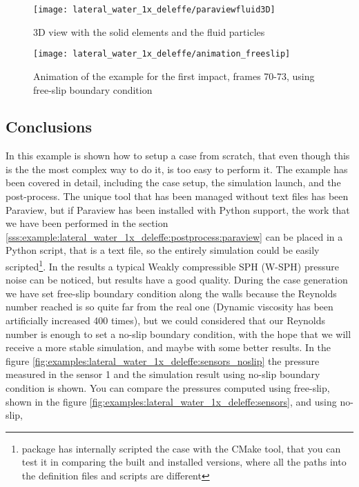 %
\begin{figure}[ht!]
  \centering
  \texttt{[image: lateral\_water\_1x\_deleffe/paraviewfluid3D]}
  \caption{3D view with the solid elements and the fluid particles}
  \label{fig:examples:lateral_water_1x_deleffe:paraviewfluid3D}
\end{figure}
%
\begin{figure}[ht!]
  \centering
  \texttt{[image: lateral\_water\_1x\_deleffe/animation\_freeslip]}
  \caption{Animation of the example for the first impact, frames 70-73, using free-slip boundary condition}
  \label{fig:examples:lateral_water_1x_deleffe:paraviewanimation}
\end{figure}
%
\subsection{Conclusions}
\label{ss:example:lateral_water_1x_deleffe:conclusions}
%
In this example is shown how to setup a case from scratch, that even though this is the the most complex way to
do it, is too easy to perform it. The example has been covered in detail, including the case setup, the
simulation launch, and the post-process.\rc
%
The unique tool that has been managed without text files has been Paraview, but if Paraview has been installed
with Python support, the work that we have been performed in the section
\ref{sss:example:lateral_water_1x_deleffe:postprocess:paraview} can be placed in a Python script, that is a text
file, so the entirely simulation could be easily scripted\footnote{\NAME package has internally scripted the
case with the CMake tool, that you can test it in comparing the built and installed versions, where all the paths
into the definition files and scripts are different}.\rc
%
In the results a typical Weakly compressible SPH (W-SPH) pressure noise can be noticed, but results have a good
quality.\rc
%
During the case generation we have set free-slip boundary condition along the walls because the Reynolds number
reached is so quite far from the real one (Dynamic viscosity has been artificially increased 400 times), but
we could considered that our Reynolds number is enough to set a no-slip boundary condition, with the hope that
we will receive a more stable simulation, and maybe with some better results. In the figure \ref{fig:examples:lateral_water_1x_deleffe:sensors_noslip} the pressure measured in the sensor 1 and the
simulation result using no-slip boundary condition is shown. You can compare the pressures computed using
free-slip, shown in the figure \ref{fig:examples:lateral_water_1x_deleffe:sensors}, and using no-slip,
